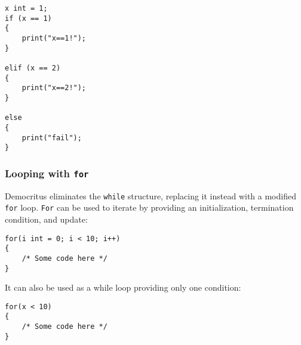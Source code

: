             \begin{lstlisting}
x int = 1;
if (x == 1)
{
    print("x==1!");
}

elif (x == 2)
{
    print("x==2!");
}

else 
{
    print("fail");
}
            \end{lstlisting}

        \subsubsection{Looping with \texttt{for}}
            Democritus eliminates the \texttt{while} structure, replacing it instead with a modified \texttt{for} loop. \texttt{For} can be used to iterate by providing an initialization, termination condition, and update:
            \begin{lstlisting}
for(i int = 0; i < 10; i++)
{
    /* Some code here */
}
            \end{lstlisting}

            It can also be used as a while loop providing only one condition:

            \begin{lstlisting}
for(x < 10)
{
    /* Some code here */
}
            \end{lstlisting}


